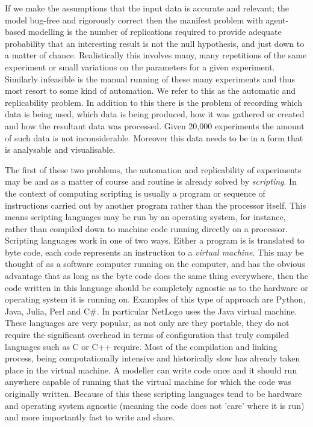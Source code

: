 \documentclass[runningheads]{llncs}
\begin{document}
If we make the assumptions that the input data is accurate and relevant; the
model bug-free and rigorously correct then the manifest problem with
agent-based modelling is the number of replications required to provide
adequate probability that an interesting result is not the null hypothesis, and
just down to a matter of chance. Realistically this involves many, many
repetitions of the same experiment or small variations on the parameters for a
given experiment. Similarly infeasible is the manual running of these many
experiments and thus most resort to some kind of automation. We refer to this
as the automatic and replicability problem. In  addition to this there is the
problem of recording which data is being used, which data is being produced,
how it was gathered or created and how the resultant data was processed. Given
20,000 experiments the amount of such data is not inconsiderable. Moreover this
data needs to be in a form that is analysable and visualisable. 

The first of these two problems, the automation and replicability of
experiments  may be and as a matter of course and routine is already solved by
\emph{scripting}.  In the context of computing scripting is usually a program
or sequence of instructions carried out by another program rather than the
processor itself. This means scripting languages may be run by an
operating system, for instance, rather than compiled down to machine code
running directly on a processor.  Scripting languages work in one of two ways.
Either a program is is translated to  byte code, each code represents an
instruction to a \emph{virtual machine}.  This may be thought of as a software
computer running on the computer, and has the  obvious advantage that as long
as the byte code does the same thing everywhere, then the code written in this
language should be completely agnostic as to the hardware or operating system
it is running on.  Examples of this type of approach are Python, Java, Julia,
Perl and  C\#. In particular NetLogo uses the Java virtual machine. These
languages are very popular, as not only are they portable, they do not require
the significant overhead in terms of configuration that truly compiled
languages such as C or C++ require.  Most of the compilation and linking
process, being computationally intensive and historically slow  has already
taken place in the virtual machine. A modeller can write code once and it
should run anywhere capable of running that the virtual machine for which the
code was originally written. Because of this these scripting languages tend to
be hardware and operating system agnostic (meaning the code does not 'care'
where it is run) and more importantly fast to write and share.
\end{document}
